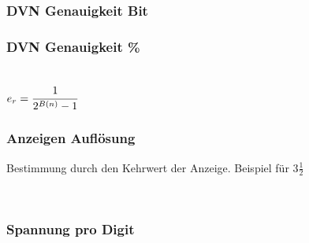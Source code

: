 \subsubsection{DVN Genauigkeit Bit}
\begin{minipage}{0.45\textwidth}
\end{minipage}
\begin{minipage}{0.45\textwidth}
\end{minipage}

\subsubsection{DVN Genauigkeit \%} 
\begin{minipage}{0.45\textwidth} 
 \\
$e_r= \cfrac{1}{2^{B(n)} - 1}$
\end{minipage} 
\begin{minipage}{0.45\textwidth} 
 
\end{minipage} 

\subsubsection{Anzeigen Auflösung} 

Bestimmung durch den Kehrwert der Anzeige. Beispiel für $3\frac{1}{2}$ 

\begin{minipage}{0.45\textwidth} 
 \\
\end{minipage} 
\begin{minipage}{0.45\textwidth} 
\end{minipage} 

\subsubsection{Spannung pro Digit} 
\begin{minipage}{0.45\textwidth} 
 \\
\end{minipage} 
\begin{minipage}{0.45\textwidth} 
 
\end{minipage} 

